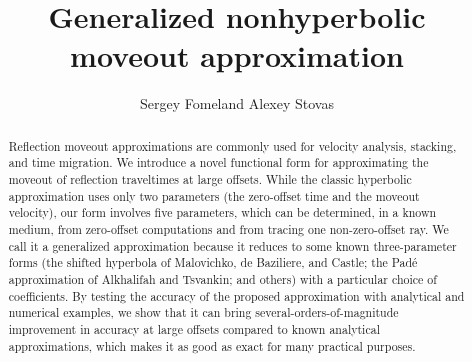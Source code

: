 \title{Generalized nonhyperbolic moveout approximation}

\renewcommand{\thefootnote}{\fnsymbol{footnote}}
\newcommand{\arccosh}{\mbox{arccosh}}


\author{Sergey Fomel\footnotemark[1] and Alexey Stovas\footnotemark[2]}

\address{
\footnotemark[1]Bureau of Economic Geology, \\
John A. and Katherine G. Jackson School of Geosciences \\
The University of Texas at Austin \\
University Station, Box X \\
Austin, TX 78713-8972 \\
USA \\
sergey.fomel@beg.utexas.edu \\
\footnotemark[2]Department of Petroleum Engineering and
Applied Geophysics \\
Norwegian University of Science and Technology (NTNU) \\
S.P. Andersenvei 15A \\
7491 Trondheim \\
Norway \\
alexey.stovas@ntnu.no
}

\maketitle

\begin{abstract}
  Reflection moveout approximations are commonly used for velocity
  analysis, stacking, and time migration.  We introduce a novel
  functional form for approximating the moveout of reflection
  traveltimes at large offsets. While the classic hyperbolic
  approximation uses only two parameters (the zero-offset time and the
  moveout velocity), our form involves five parameters, which can be
  determined, in a known medium, from zero-offset computations and
  from tracing one non-zero-offset ray. We call it a generalized
  approximation because it reduces to some known three-parameter forms
  (the shifted hyperbola of Malovichko, de Baziliere, and Castle; the
  Pad\'{e} approximation of Alkhalifah and Tsvankin; and others) with
  a particular choice of coefficients. By testing the accuracy of the
  proposed approximation with analytical and numerical examples, we
  show that it can bring several-orders-of-magnitude improvement in
  accuracy at large offsets compared to known analytical
  approximations, which makes it as good as exact for many practical
  purposes.
\end{abstract}

